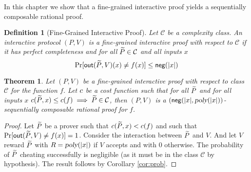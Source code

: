 
\newtheorem*{theorem*}{Theorem}
\newtheorem*{definition*}{Definition}

\noindent
In this chapter we show that a fine-grained interactive proof yields a sequentially composable rational proof.

\def\sndCls{\mathcal{C}}

\begin{definition*}[Fine-Grained Interactive Proof]
Let $\sndCls$ be a complexity class. An interactive protocol $(P, V)$ is a fine-grained interactive proof with respect to $\sndCls$ if it has perfect completeness and for all $\disP \in \sndCls$ and all inputs $x$
$$ \Pr[\mathsf{out}(\widetilde{P},V)(x) \not = f(x)] \leq  \mathsf{neg}(|x|)$$
\end{definition*}

\begin{theorem*}
Let $(P, V)$ be a fine-grained interactive proof with respect to class $\sndCls$ for the function $f$. Let $c$ be a cost function such that for all $\widetilde{P}$ and for all inputs $x$ $\cost(\disP, x) \leq \cost(f) \implies \disP \in \sndCls$, then $(P, V)$ is a $(\mathsf{neg}(|x|, {\textsl{poly}}(|x|))$-sequentially composable rational proof for $f$.
\end{theorem*}
\begin{proof}
	Let $\widetilde{P}$ be a prover such that $c(\widetilde{P}, x) < c(f)$ and such that $\Pr[\mathsf{out}(\widetilde{P}, V) \not = f(x)] = 1$. Consider the interaction between $\widetilde{P}$ and $V$. And let $V$ reward $\widetilde{P}$ with $R = {\textsl{poly}}(|x|)$ if $V$ accepts and with $0$ otherwise.
	The probability of $\widetilde{P}$ cheating successfully is negligible (as it must be in the class $\sndCls$ by hypothesis).  The result follows by Corollary \ref{cor:prob}.
\end{proof}
